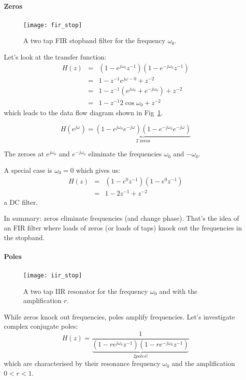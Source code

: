 \documentclass[12pt,a4paper]{article}
\begin{document}
\paragraph{Zeros}
\begin{figure}[!hbt]
\begin{center}
\mbox{\texttt{[image: fir\_stop]}}
\end{center}
\caption{A two tap FIR stopband filter for the frequency $\omega_0$.
\label{fir_stop}}
\end{figure}
Let's look at the transfer function:
\begin{eqnarray}
H(z) & = & (1 - e^{j\omega_0} z^{-1})(1 - e^{-j\omega_0} z^{-1}) \\
     & = & 1 - z^{-1} e^{j \omega-{0}} + z^{-2} \\
     & = & 1 - z^{-1} (e^{j \omega_{0}} + e^{-j \omega_{0}}) + z^{-2} \\
     & = & 1 - z^{-1} 2 \cos \omega_{0} + z^{-2}
\end{eqnarray}
which leads to the data flow diagram shown in Fig~\ref{fir_stop}.

\begin{equation}
H(e^{j\omega}) = \underbrace{(1 - e^{j\omega_0}e^{-j\omega})(1 - e^{-j\omega_0} e^{-j\omega})}_{\mbox{2 zeros}}
\end{equation}

The zeroes at 
$e^{j \omega_{0}}$ and $e^{-j \omega_0}$ 
eliminate the frequencies $\omega_{0}$ and $-\omega_{0}$. 

A special case is $\omega_{0} = 0$
which gives us:
\begin{eqnarray}
H(z) & = & (1 - e^{0} z^{-1})(1 - e^{0} z^{-1}) \\
     & = & 1 - 2 z^{-1} + z^{-2}
\end{eqnarray}
a DC filter.

In summary: zeros eliminate frequencies (and change phase).
That's the idea of an FIR filter where loads of zeros (or loads of taps)
knock out the frequencies in the stopband.


\paragraph{Poles}
\begin{figure}[!hbt]
\begin{center}
\mbox{\texttt{[image: iir\_stop]}}
\end{center}
\caption{A two tap IIR resonator for the frequency $\omega_0$ and with
the amplification $r$.
\label{iir_stop}}
\end{figure}
While zeros knock out frequencies, poles amplify frequencies.
Let's investigate complex conjugate poles:
\begin{equation}
H(z) = \frac{1}{\underbrace{(1 - r e^{j \omega_{0}} z^{-1})(1 - r e^{-j \omega_{0}} z^{-1})}_{2 poles!}} 
\label{resonatorz}
\end{equation}
which are characterised by their resonance frequency $\omega_0$
and the amplification $0<r<1$.
\end{document}
